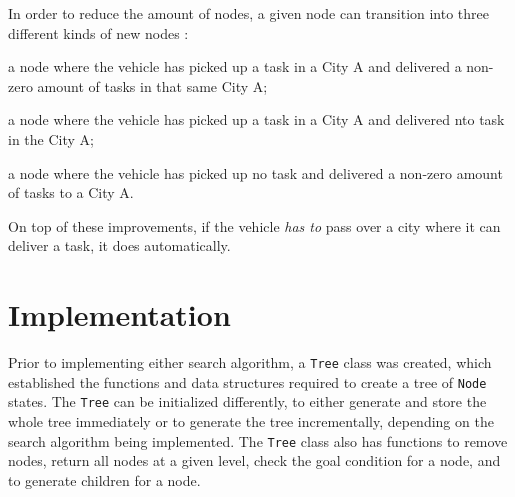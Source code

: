 \documentclass[11pt]{article}
\begin{document}
In order to reduce the amount of nodes, a given node can transition into three different kinds of new nodes : 

\begin{compactenum}
	\item a node where the vehicle has picked up a task in a City A and delivered a non-zero amount of tasks in that same City A;
	\item a node where the vehicle has picked up a task in a City A and delivered nto task in the City A;                                                                   	\item a node where the vehicle has picked up no task and delivered a non-zero amount of tasks to a City A.\\
\end{compactenum}

On top of these improvements, if the vehicle \textit{has to} pass over a city where it can deliver a task, it does automatically.

\section{Implementation}
Prior to implementing either search algorithm, a \texttt{Tree} class was created, which established the functions and data structures required to create a tree of \texttt{Node} states. The \texttt{Tree} can be initialized differently, to either generate and store the whole tree immediately or to generate the tree incrementally, depending on the search algorithm being implemented. The \texttt{Tree} class also has functions to remove nodes, return all nodes at a given level, check the goal condition for a node, and to generate children for a node. 
\end{document}
